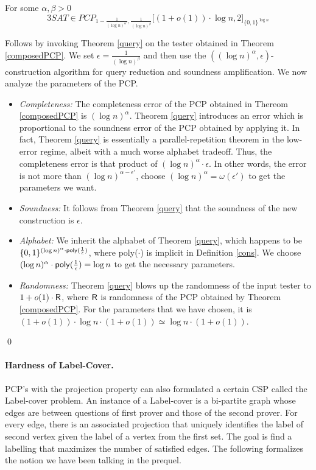 \begin{theorem}\label{main} 
For some $\alpha, \beta > 0$
\[
  3SAT \in PCP_{1 - \frac{1}{(\log n)^{\alpha'}}, \frac{1}{(\log n)^\beta} } \big[ (1 + o(1) ) \cdot \log n,  2 \big ]_{\{0,1\}^{\log n}}
\]

\end{theorem}
 Follows by invoking Theorem \ref{query} on the
tester obtained in Theorem \ref{composedPCP}. We  set $\epsilon =
\frac{1}{(\log n)^\beta} $ and then use the $((\log n)^\alpha, \epsilon)$-construction algorithm for query
reduction and soundness amplification. We now analyze the parameters
of the PCP.
\begin{itemize}

\item {\em Completeness:} The completeness error of the PCP
  obtained in Thereom \ref{composedPCP} is $(\log n)^\alpha$. Theorem \ref{query}
  introduces an error which is proportional to the soundness error of
  the PCP obtained by applying it. In fact, Theorem \ref{query} is
  essentially a parallel-repetition theorem in the low-error regime,
  albeit with a much worse alphabet tradeoff. Thus, the completeness
  error is that product of $(\log n)^\alpha \cdot \epsilon$. In other words,
  the error is not more than $(\log n)^{\alpha - \epsilon'}$, choose $(\log n)^\alpha =
  \omega(\epsilon')$ to get the parameters we want.

\item {\em Soundness:} It follows from Theorem \ref{query} that the
  soundness of the new construction is $\epsilon$.

\item {\em Alphabet:} We inherit the alphabet of Theorem \ref{query},
  which happens to be $\{0,1\}^{(\log n)^\alpha \cdot 
{\sf poly}(\frac{1}{\epsilon})}$, where {\sf poly}($\cdot$) is
  implicit in Definition \ref{cons}. We choose  ${(\log n)^\alpha \cdot 
{\sf poly}(\frac{1}{\epsilon})} = \log n$ to get the necessary parameters.

\item {\em Randomness:} Theorem \ref{query} blows up the randomness of
  the input tester to ${1 + o(1)} \cdot {\sf R}$, where ${\sf R}$ is
  randomness of the PCP obtained by Theorem \ref{composedPCP}. For the
  parameters that we have chosen, it is $(1 + o(1)) \cdot \log n \cdot (1 + o(1))  
\simeq \log n \cdot (1 + o(1))$.
\end{itemize}
\qed

\paragraph{\bf Hardness of Label-Cover.}\label{label-cover} PCP's with the 
projection property can also formulated a certain CSP called the {\sc
  Label-cover} problem. An instance of a {\sc Label-cover} is a
bi-partite graph whose edges are between questions of first prover and
those of the second prover. For every edge, there is an associated
projection that uniquely identifies the label of second vertex given
the label of a vertex from the first set. The goal is find a labelling
that maximizes the number of satisfied edges.  The following
formalizes the notion we have been talking in the prequel.

